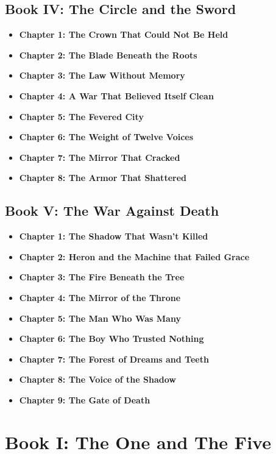 \documentclass[12pt]{article}
\begin{document}
\begin{titlepage}
\subsection*{Book IV: The Circle and the Sword}
\begin{itemize}
  \item \textbf{Chapter 1: The Crown That Could Not Be Held}
  \item \textbf{Chapter 2: The Blade Beneath the Roots}
  \item \textbf{Chapter 3: The Law Without Memory}
  \item \textbf{Chapter 4: A War That Believed Itself Clean}
  \item \textbf{Chapter 5: The Fevered City}
  \item \textbf{Chapter 6: The Weight of Twelve Voices}
  \item \textbf{Chapter 7: The Mirror That Cracked}
  \item \textbf{Chapter 8: The Armor That Shattered}
\end{itemize}

\vspace{.33in}

\subsection*{Book V: The War Against Death}
\begin{itemize}
  \item \textbf{Chapter 1: The Shadow That Wasn’t Killed}
  \item \textbf{Chapter 2: Heron and the Machine that Failed Grace}
  \item \textbf{Chapter 3: The Fire Beneath the Tree}
  \item \textbf{Chapter 4: The Mirror of the Throne}
  \item \textbf{Chapter 5: The Man Who Was Many}
  \item \textbf{Chapter 6: The Boy Who Trusted Nothing}
  \item \textbf{Chapter 7: The Forest of Dreams and Teeth}
  \item \textbf{Chapter 8: The Voice of the Shadow}
  \item \textbf{Chapter 9: The Gate of Death}
\end{itemize}
\end{titlepage}

\newpage

\section*{Book I: The One and The Five}
\end{document}
